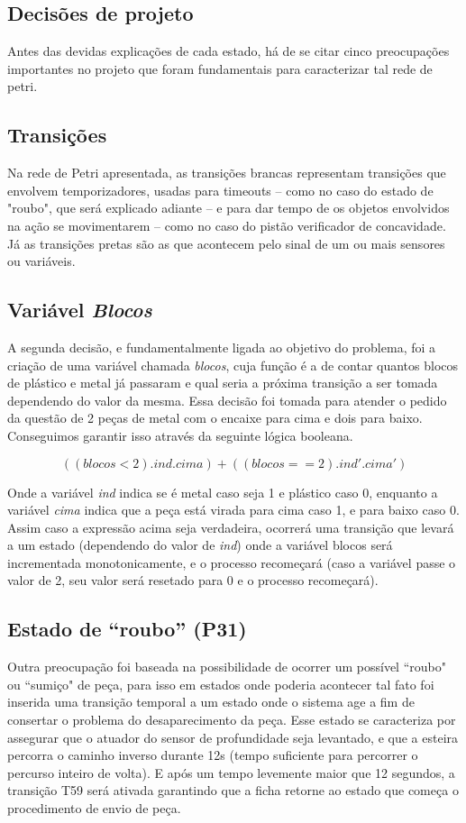\documentclass[a4paper,twoside]{articlewithlogo}
\begin{document}
\subsection{Decisões de projeto} Antes das devidas explicações de cada estado, há de se citar cinco preocupações importantes no projeto que foram fundamentais para caracterizar tal rede de petri. 

\subsection*{Transições} Na rede de Petri apresentada, as transições brancas representam transições que envolvem temporizadores, usadas para timeouts -- como no caso do estado de "roubo", que será explicado adiante -- e para dar tempo de os objetos envolvidos na ação se movimentarem -- como no caso do pistão verificador de concavidade. Já as transições pretas são as que acontecem pelo sinal de um ou mais sensores ou variáveis.

\subsection*{Variável \textit{Blocos}} A segunda decisão, e fundamentalmente ligada ao objetivo do problema, foi a criação de uma variável chamada \textit{blocos}, cuja função é a de contar quantos blocos de plástico e metal já passaram e qual seria a próxima transição a ser tomada dependendo do valor da mesma. Essa decisão foi tomada para atender o pedido da questão de 2 peças de metal com o encaixe para cima e dois para baixo. Conseguimos garantir isso através da seguinte lógica booleana.

\begin{equation}
	((blocos<2).ind.cima)+((blocos==2).ind'.cima')
	\label{eq:logicadeblocos}
\end{equation}

Onde a variável \textit{ind} indica se é metal caso seja 1 e plástico caso 0, enquanto a variável \textit{cima} indica que a peça está virada para cima caso 1, e para baixo caso 0. Assim caso a expressão acima seja verdadeira, ocorrerá uma transição que levará a um estado (dependendo do valor de \textit{ind}) onde a variável blocos será incrementada monotonicamente, e o processo recomeçará (caso a variável passe o valor de 2, seu valor será resetado para 0 e o processo recomeçará).

\subsection*{Estado de ``roubo'' (P31)} Outra preocupação foi baseada na possibilidade de ocorrer um possível ``roubo" ou ``sumiço" de peça, para isso em estados onde poderia acontecer tal fato foi inserida uma transição temporal a um estado onde o sistema age a fim de consertar o problema do desaparecimento da peça. Esse estado se caracteriza por assegurar que o atuador do sensor de profundidade seja levantado, e que a esteira percorra o caminho inverso durante 12s (tempo suficiente para percorrer o percurso inteiro de volta). E após um tempo levemente maior que 12 segundos, a transição T59 será ativada garantindo que a ficha retorne ao estado que começa o procedimento de envio de peça.
\end{document}
